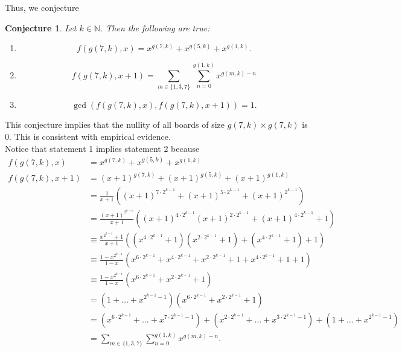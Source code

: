 \documentclass{article}
\newtheorem{conjecture}{Conjecture}
\newcommand{\N}{\mathbb{N}}
\begin{document}
	Thus, we conjecture
	\begin{conjecture}
		Let $k \in \N$.
		Then the following are true:
		\begin{enumerate}
			\item
			\begin{equation*}
				f(g(7,k),x) = x^{g(7,k)} + x^{g(5,k)} + x^{g(1,k)}.
			\end{equation*}
			\item
			\begin{equation*}
				f(g(7,k),x+1) = \sum_{m\in\{1,3,7\}}{\sum_{n=0}^{g(1,k)}{x^{g(m,k)-n}}}
			\end{equation*}
			\item
			\begin{equation*}
				\gcd\left(f(g(7,k),x),f(g(7,k),x+1)\right) = 1.
			\end{equation*}
		\end{enumerate}
	\end{conjecture}
	This conjecture implies that the nullity of all boards of size $g(7,k) \times g(7,k)$ is 0.
	This is consistent with empirical evidence. \\
	
	Notice that statement 1 implies statement 2 because
	\begin{align*}
		f(g(7,k),x) &= x^{g(7,k)} + x^{g(5,k)} + x^{g(1,k)} \\
		f(g(7,k),x+1) &= (x+1)^{g(7,k)} + (x+1)^{g(5,k)} + (x+1)^{g(1,k)} \\
		&= \frac{1}{x+1} \left((x+1)^{7\cdot2^{k-1}} + (x+1)^{5\cdot2^{k-1}} + (x+1)^{2^{k-1}}\right) \\
		&= \frac{(x+1)^{2^{k-1}}}{x+1}\left((x+1)^{4\cdot2^{k-1}}(x+1)^{2\cdot2^{k-1}}+(x+1)^{4\cdot2^{k-1}}+1\right) \\
		&\equiv \frac{x^{2^{k-1}}+1}{x+1}\left(\left(x^{4\cdot2^{k-1}}+1\right)\left(x^{2\cdot2^{k-1}}+1\right)+\left(x^{4\cdot2^{k-1}}+1\right)+1\right) \\
		&\equiv \frac{1-x^{2^{k-1}}}{1-x}\left(x^{6\cdot2^{k-1}}+x^{4\cdot2^{k-1}}+x^{2\cdot2^{k-1}}+1+x^{4\cdot2^{k-1}}+1+1\right) \\
		&\equiv \frac{1-x^{2^{k-1}}}{1-x}\left(x^{6\cdot2^{k-1}}+x^{2\cdot2^{k-1}}+1\right) \\
		&= \left(1+\dots+x^{2^{k-1}-1}\right)\left(x^{6\cdot2^{k-1}}+x^{2\cdot2^{k-1}}+1\right) \\
		&= \left(x^{6\cdot2^{k-1}}+\dots+x^{7\cdot2^{k-1}-1}\right) + \left(x^{2\cdot2^{k-1}}+\dots+x^{3\cdot2^{k-1}-1}\right) + \left(1+\dots+x^{2^{k-1}-1}\right) \\
		&= \sum_{m\in\{1,3,7\}}{\sum_{n=0}^{g(1,k)}{x^{g(m,k)-n}}}.
	\end{align*}
	
\end{document}

